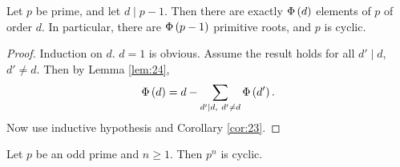 \begin{theorem}
\label{thm:25}
Let $ p $ be prime, and let $ d \mid p - 1 $. Then there are exactly $ \Phi\left( d \right) $ elements of $ \unit{p} $ of order $ d $. In particular, there are $ \Phi\left( p - 1 \right) $ primitive roots, and $ \unit{p} $ is cyclic.
\end{theorem}

\begin{proof}
Induction on $ d $. $ d = 1 $ is obvious. Assume the result holds for all $ d' \mid d $, $ d' \ne d $. Then by Lemma \ref{lem:24},
$$ \Phi\left( d \right) = d - \sum_{d' \mid d, \ d' \ne d} \Phi\left( d' \right). $$
Now use inductive hypothesis and Corollary \ref{cor:23}.
\end{proof}


\begin{proposition}
Let $ p $ be an odd prime and $ n \ge 1 $. Then $ \unit{p^n} $ is cyclic.
\end{proposition}


